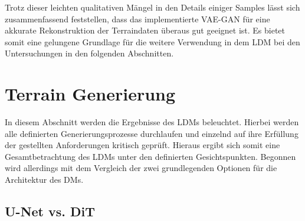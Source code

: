 Trotz dieser leichten qualitativen Mängel in den Details einiger Samples lässt sich zusammenfassend feststellen, dass das implementierte VAE-GAN für eine akkurate Rekonstruktion der Terraindaten überaus gut geeignet ist. Es bietet somit eine gelungene Grundlage für die weitere Verwendung in dem LDM bei den Untersuchungen in den folgenden Abschnitten.

\section {Terrain Generierung}

In diesem Abschnitt werden die Ergebnisse des LDMs beleuchtet. Hierbei werden alle definierten Generierungsprozesse durchlaufen und einzelnd auf ihre Erfüllung der gestellten Anforderungen kritisch geprüft. Hieraus ergibt sich somit eine Gesamtbetrachtung des LDMs unter den definierten Gesichtspunkten. Begonnen wird allerdings mit dem Vergleich der zwei grundlegenden Optionen für die Architektur des DMs. 

\subsection {U-Net vs. DiT}

